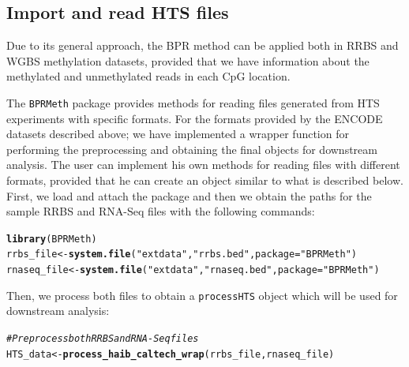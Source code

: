\documentclass{article}\usepackage[]{graphicx}\usepackage[]{color}
\makeatletter
\newcommand{\hlstr}[1]{\textcolor[rgb]{0.192,0.494,0.8}{#1}}%
\newcommand{\hlcom}[1]{\textcolor[rgb]{0.678,0.584,0.686}{\textit{#1}}}%
\newcommand{\hlstd}[1]{\textcolor[rgb]{0.345,0.345,0.345}{#1}}%
\newcommand{\hlkwb}[1]{\textcolor[rgb]{0.69,0.353,0.396}{#1}}%
\newcommand{\hlkwc}[1]{\textcolor[rgb]{0.333,0.667,0.333}{#1}}%
\newcommand{\hlkwd}[1]{\textcolor[rgb]{0.737,0.353,0.396}{\textbf{#1}}}%
\newenvironment{kframe}{%
 \def\at@end@of@kframe{}%
 \ifinner\ifhmode%
  \def\at@end@of@kframe{\end{minipage}}%
  \begin{minipage}{\columnwidth}%
 \fi\fi%
 \def\FrameCommand##1{\hskip\@totalleftmargin \hskip-\fboxsep
 \colorbox{shadecolor}{##1}\hskip-\fboxsep
     \hskip-\linewidth \hskip-\@totalleftmargin \hskip\columnwidth}%
 \MakeFramed {\advance\hsize-\width
   \@totalleftmargin\z@ \linewidth\hsize
   \@setminipage}}%
 {\par\unskip\endMakeFramed%
 \at@end@of@kframe}
\makeatother
\begin{document}
\subsection{Import and read HTS files}
Due to its general approach, the BPR method can be applied both in RRBS and WGBS methylation datasets, provided that we have information about the methylated and unmethylated reads in each CpG location.

The \verb|BPRMeth| package provides methods for reading files generated from HTS experiments with specific formats. For the formats provided by the ENCODE datasets described above; we have implemented a wrapper function  for performing the preprocessing and obtaining the final objects for downstream analysis. The user can implement his own methods for reading files with different formats, provided that he can create an object similar to what is described below. First, we load and attach the package and then we obtain the paths for the sample RRBS and RNA-Seq files with the following commands:
\begin{kframe}
\begin{alltt}
\hlkwd{library}\hlstd{(BPRMeth)}
\hlstd{rrbs_file} \hlkwb{<-} \hlkwd{system.file}\hlstd{(}\hlstr{"extdata"}\hlstd{,} \hlstr{"rrbs.bed"}\hlstd{,} \hlkwc{package} \hlstd{=} \hlstr{"BPRMeth"}\hlstd{)}
\hlstd{rnaseq_file} \hlkwb{<-} \hlkwd{system.file}\hlstd{(}\hlstr{"extdata"}\hlstd{,} \hlstr{"rnaseq.bed"}\hlstd{,} \hlkwc{package} \hlstd{=} \hlstr{"BPRMeth"}\hlstd{)}
\end{alltt}
\end{kframe}

Then, we process both files to obtain a \verb|processHTS| object which will be used for downstream analysis:
\begin{kframe}
\begin{alltt}
\hlcom{# Preprocess both RRBS and RNA-Seq files}
\hlstd{HTS_data} \hlkwb{<-} \hlkwd{process_haib_caltech_wrap}\hlstd{(rrbs_file, rnaseq_file)}
\end{alltt}
\end{kframe}
\end{document}
